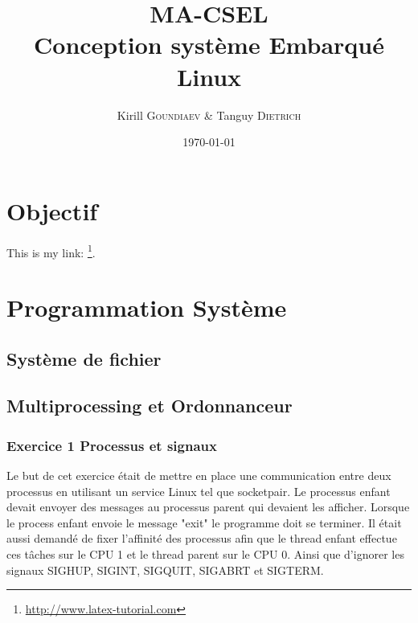 \documentclass[
	a4paper, %
	10pt, %
]{CSUniSchoolLabReport}
\title{MA-CSEL \\ Conception syst\`eme Embarqué Linux } %
\author{Kirill \textsc{Goundiaev} \& Tanguy \textsc{Dietrich}} %
\date{\today} %
\begin{document}
\maketitle %

\begin{figure}[H] %
\label{fig:speciation}
\end{figure}


\newpage

\tableofcontents
\newpage


\section{Objectif}

This is my link: \footnote{\href{http://www.latex-tutorial.com}{http://www.latex-tutorial.com}}.

\section{Programmation Syst\`eme}

\subsection{Syst\`eme de fichier}\label{filesystem}

\subsection{Multiprocessing et Ordonnanceur}\label{multiprocess}
\subsubsection{Exercice 1 Processus et signaux}\label{MPEx1}
Le but de cet exercice \'etait de mettre en place une communication entre deux processus en utilisant un service Linux tel que socketpair.
Le processus enfant devait envoyer des messages au processus parent qui devaient les afficher. Lorsque le process enfant envoie le message "exit" le programme doit se terminer.
Il \'etait aussi demand\'e de fixer l'affinité des processus afin que le thread enfant effectue ces t\^aches sur le CPU 1 et le thread parent sur le CPU 0.
Ainsi que d'ignorer les signaux SIGHUP, SIGINT, SIGQUIT, SIGABRT et SIGTERM.\\
\end{document}
